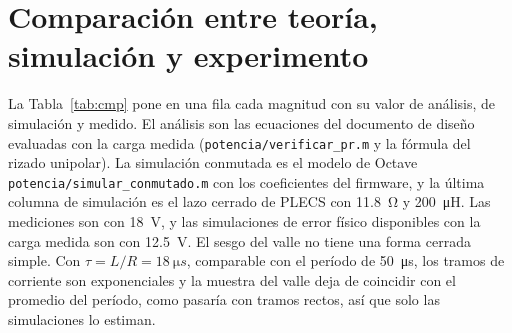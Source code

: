 \documentclass[journal]{IEEEtran}
\begin{document}
\section{Comparación entre teoría, simulación y experimento}
\label{sec:comparacion}
La Tabla~\ref{tab:cmp} pone en una fila cada magnitud con su valor de análisis, de simulación y medido. El análisis son las ecuaciones del documento de diseño evaluadas con la carga medida (\texttt{potencia/verificar\_pr.m} y la fórmula del rizado unipolar). La simulación conmutada es el modelo de Octave \texttt{potencia/simular\_conmutado.m} con los coeficientes del firmware, y la última columna de simulación es el lazo cerrado de PLECS con \SI{11.8}{\ohm} y \SI{200}{\micro H}. Las mediciones son con \SI{18}{V}, y las simulaciones de error físico disponibles con la carga medida son con \SI{12.5}{V}. El sesgo del valle no tiene una forma cerrada simple. Con $\tau=L/R=\SI{18}{\micro s}$, comparable con el período de \SI{50}{\micro s}, los tramos de corriente son exponenciales y la muestra del valle deja de coincidir con el promedio del período, como pasaría con tramos rectos, así que solo las simulaciones lo estiman.
\end{document}
